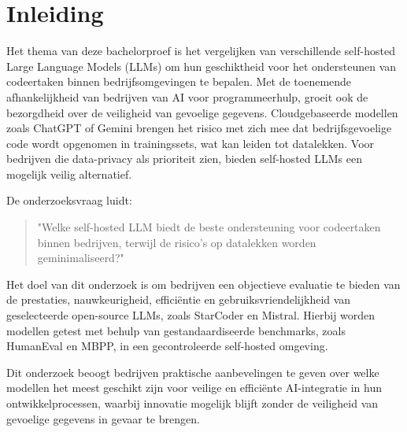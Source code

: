 


% 

\section{Inleiding}%
\label{sec:inleiding}

Het thema van deze bachelorproef is het vergelijken van verschillende self-hosted Large Language Models (LLMs) om hun geschiktheid voor het ondersteunen van codeertaken binnen bedrijfsomgevingen te bepalen. Met de toenemende afhankelijkheid van bedrijven van AI voor programmeerhulp, groeit ook de bezorgdheid over de veiligheid van gevoelige gegevens. Cloudgebaseerde modellen zoals ChatGPT of Gemini brengen het risico met zich mee dat bedrijfsgevoelige code wordt opgenomen in trainingssets, wat kan leiden tot datalekken. Voor bedrijven die data-privacy als prioriteit zien, bieden self-hosted LLMs een mogelijk veilig alternatief.  

De onderzoeksvraag luidt: 

\begin{quote} 
  "Welke self-hosted LLM biedt de beste ondersteuning voor codeertaken binnen bedrijven, terwijl de risico's op datalekken worden geminimaliseerd?" 
\end{quote}

Het doel van dit onderzoek is om bedrijven een objectieve evaluatie te bieden van de prestaties, nauwkeurigheid, efficiëntie en gebruiksvriendelijkheid van geselecteerde open-source LLMs, zoals StarCoder en Mistral. Hierbij worden modellen getest met behulp van gestandaardiseerde benchmarks, zoals HumanEval en MBPP, in een gecontroleerde self-hosted omgeving.  

Dit onderzoek beoogt bedrijven praktische aanbevelingen te geven over welke modellen het meest geschikt zijn voor veilige en efficiënte AI-integratie in hun ontwikkelprocessen, waarbij innovatie mogelijk blijft zonder de veiligheid van gevoelige gegevens in gevaar te brengen.

